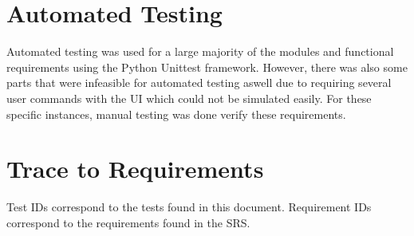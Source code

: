 \documentclass[12pt, titlepage]{article}
\begin{document}
\section{Automated Testing}
Automated testing was used for a large majority of the modules and functional requirements using the Python Unittest framework. However, there was also some parts that were infeasible for automated testing aswell due to requiring several user commands with the UI which could not be simulated easily. For these specific instances, manual testing was done verify these requirements.
		
\section{Trace to Requirements}
\noindent Test IDs correspond to the tests found in this document. Requirement IDs correspond to the requirements found in the SRS. \\
\end{document}
